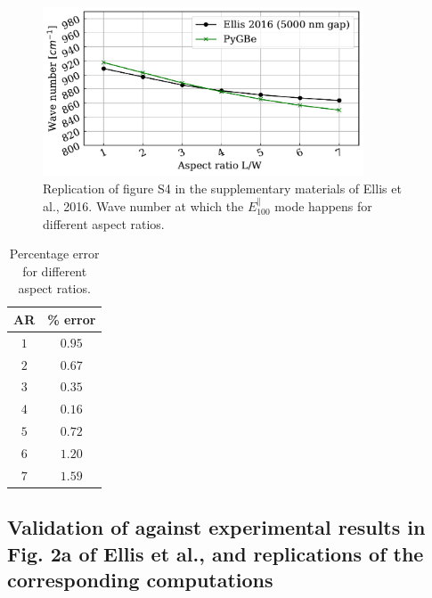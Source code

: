 \begin{figure}
    \centering
    \includegraphics[width=0.85\textwidth]{AR_rep_FS4_Ellis2016.pdf} 
    \caption{Replication of figure S4 in the supplementary materials of Ellis et al., 2016. Wave
    number at which the $E^{\parallel}_{100}$ mode happens for different aspect ratios.}
    \label{fig:rep_FS4_ellis}
 \end{figure}
 
 \begin{table}
    \centering
    \caption{Percentage error for different aspect ratios.} 
    \label{tab:err_AR}
    \begin{tabular}{c c}
    \hline%
    AR & \% error \\
    \hline%
     $1$ & $0.95$ \\
     $2$ & $0.67$ \\
     $3$ & $0.35$ \\
     $4$ & $0.16$ \\
     $5$ & $0.72$ \\
     $6$ & $1.20$ \\
     $7$ & $1.59$ \\
    \hline%
    \end{tabular}
\end{table}

\subsection{Validation of \pygbe against experimental results in Fig. 2a of Ellis et al., and replications
of the corresponding computations}

